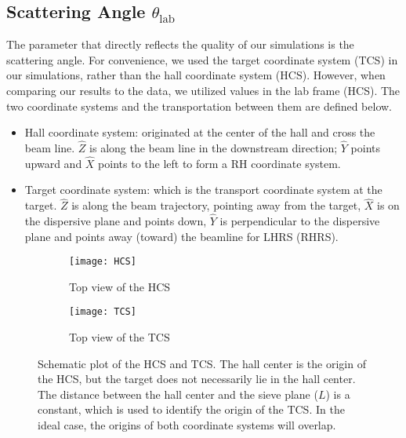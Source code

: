 

\subsection{Scattering Angle $\theta_{\text{lab}}$}
The parameter that directly reflects the quality of our simulations is the scattering
angle. For convenience, we used the target coordinate system (TCS) in our simulations,
rather than the hall coordinate system (HCS). However, when comparing our results to the data, we utilized values in the lab frame (HCS). 
The two coordinate systems and the transportation between them are defined below.

\begin{itemize}
    \item Hall coordinate system: originated at the center of the hall and
	cross the beam line.  $\hat{Z}$ is along the beam line in the downstream direction; 
	$\hat{Y}$ points upward and $\hat{X}$ points to the left to form a RH coordinate system.
    \item Target coordinate system: which is the transport coordinate system at the target.
	$\hat{Z}$ is along the beam trajectory, pointing away from the target, 
	$\hat{X}$ is on the dispersive plane and points down, $\hat{Y}$ is perpendicular
	to the dispersive plane and points away (toward) the beamline for LHRS (RHRS).
\end{itemize}

\begin{figure}[!h]
    \begin{subfigure}[b]{0.5\textwidth}
	\texttt{[image: HCS]}
	\caption{Top view of the HCS}
    \end{subfigure}
    \begin{subfigure}[b]{0.5\textwidth}
	\texttt{[image: TCS]}
	\caption{Top view of the TCS}
    \end{subfigure}
    \caption[HCS and TCS]
    {Schematic plot of the HCS and TCS. The hall center is the origin of 
    the HCS, but the target does not necessarily lie in the hall center. The distance
    between the hall center and the sieve plane ($L$) is a constant, which is used to
    identify the origin of the TCS. In the ideal case, the origins of both coordinate
    systems will overlap.}
\end{figure}

